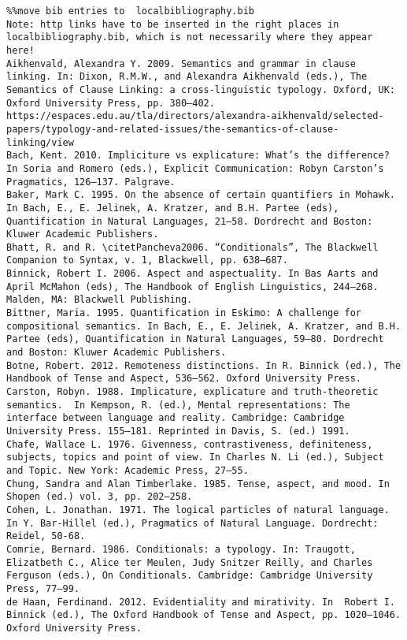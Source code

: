 \begin{verbatim}%%move bib entries to  localbibliography.bib
Note: http links have to be inserted in the right places in localbibliography.bib, which is not necessarily where they appear here!
Aikhenvald, Alexandra Y. 2009. Semantics and grammar in clause linking. In: Dixon, R.M.W., and Alexandra Aikhenvald (eds.), The Semantics of Clause Linking: a cross-linguistic typology. Oxford, UK: Oxford University Press, pp. 380–402.
https://espaces.edu.au/tla/directors/alexandra-aikhenvald/selected-papers/typology-and-related-issues/the-semantics-of-clause-linking/view
Bach, Kent. 2010. Impliciture vs explicature: What’s the difference? In Soria and Romero (eds.), Explicit Communication: Robyn Carston’s Pragmatics, 126–137. Palgrave.
Baker, Mark C. 1995. On the absence of certain quantifiers in Mohawk. In Bach, E., E. Jelinek, A. Kratzer, and B.H. Partee (eds), Quantification in Natural Languages, 21–58. Dordrecht and Boston: Kluwer Academic Publishers.
Bhatt, R. and R. \citetPancheva2006. “Conditionals”, The Blackwell Companion to Syntax, v. 1, Blackwell, pp. 638–687.
Binnick, Robert I. 2006. Aspect and aspectuality. In Bas Aarts and April McMahon (eds), The Handbook of English Linguistics, 244–268. Malden, MA: Blackwell Publishing.
Bittner, Maria. 1995. Quantification in Eskimo: A challenge for compositional semantics. In Bach, E., E. Jelinek, A. Kratzer, and B.H. Partee (eds), Quantification in Natural Languages, 59–80. Dordrecht and Boston: Kluwer Academic Publishers.
Botne, Robert. 2012. Remoteness distinctions. In R. Binnick (ed.), The Handbook of Tense and Aspect, 536–562. Oxford University Press.
Carston, Robyn. 1988. Implicature, explicature and truth-theoretic semantics.  In Kempson, R. (ed.), Mental representations: The interface between language and reality. Cambridge: Cambridge University Press. 155–181. Reprinted in Davis, S. (ed.) 1991.
Chafe, Wallace L. 1976. Givenness, contrastiveness, definiteness, subjects, topics and point of view. In Charles N. Li (ed.), Subject and Topic. New York: Academic Press, 27–55.
Chung, Sandra and Alan Timberlake. 1985. Tense, aspect, and mood. In Shopen (ed.) vol. 3, pp. 202–258.
Cohen, L. Jonathan. 1971. The logical particles of natural language. In Y. Bar-Hillel (ed.), Pragmatics of Natural Language. Dordrecht: Reidel, 50-68.
Comrie, Bernard. 1986. Conditionals: a typology. In: Traugott, Elizatbeth C., Alice ter Meulen, Judy Snitzer Reilly, and Charles Ferguson (eds.), On Conditionals. Cambridge: Cambridge University Press, 77–99.
de Haan, Ferdinand. 2012. Evidentiality and mirativity. In  Robert I. Binnick (ed.), The Oxford Handbook of Tense and Aspect, pp. 1020–1046. Oxford University Press.

\end{verbatim}
